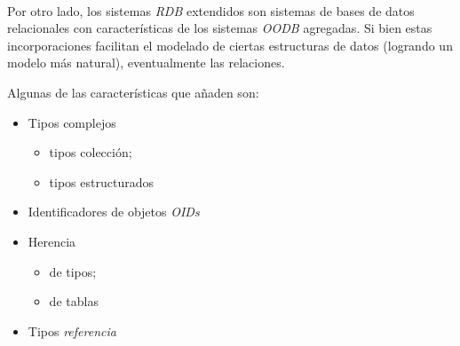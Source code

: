 ~\\

Por otro lado, los sistemas \emph{RDB} extendidos son sistemas de bases de datos relacionales con características de los sistemas \emph{OODB} agregadas. Si bien estas incorporaciones facilitan el modelado de ciertas estructuras de datos (logrando un modelo más natural), eventualmente  las relaciones.

Algunas de las características que añaden son:

\begin{itemize}
    \item Tipos complejos
        \begin{itemize}
            \item tipos colección;
            \item tipos estructurados
        \end{itemize}
    \item Identificadores de objetos \emph{OIDs} 
    \item Herencia
        \begin{itemize}
            \item de tipos;
            \item de tablas
        \end{itemize}
    \item Tipos \emph{referencia} 
\end{itemize}






\clearpage
\printbibliography


